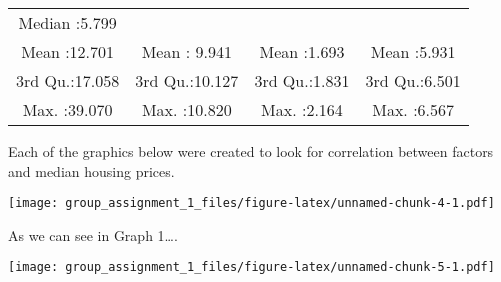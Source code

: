 \documentclass[
]{article}
\begin{document}
\begin{longtable}[]{@{}cccc@{}}
\begin{minipage}[t]{0.20\columnwidth}
Median :5.799\strut
\end{minipage}\tabularnewline
\begin{minipage}[t]{0.26\columnwidth}\centering
Mean :12.701\strut
\end{minipage} & \begin{minipage}[t]{0.21\columnwidth}\centering
Mean : 9.941\strut
\end{minipage} & \begin{minipage}[t]{0.20\columnwidth}\centering
Mean :1.693\strut
\end{minipage} & \begin{minipage}[t]{0.20\columnwidth}\centering
Mean :5.931\strut
\end{minipage}\tabularnewline
\begin{minipage}[t]{0.26\columnwidth}\centering
3rd Qu.:17.058\strut
\end{minipage} & \begin{minipage}[t]{0.21\columnwidth}\centering
3rd Qu.:10.127\strut
\end{minipage} & \begin{minipage}[t]{0.20\columnwidth}\centering
3rd Qu.:1.831\strut
\end{minipage} & \begin{minipage}[t]{0.20\columnwidth}\centering
3rd Qu.:6.501\strut
\end{minipage}\tabularnewline
\begin{minipage}[t]{0.26\columnwidth}\centering
Max. :39.070\strut
\end{minipage} & \begin{minipage}[t]{0.21\columnwidth}\centering
Max. :10.820\strut
\end{minipage} & \begin{minipage}[t]{0.20\columnwidth}\centering
Max. :2.164\strut
\end{minipage} & \begin{minipage}[t]{0.20\columnwidth}\centering
Max. :6.567\strut
\end{minipage}\tabularnewline
\bottomrule
\end{longtable}

Each of the graphics below were created to look for correlation between
factors and median housing prices.

\texttt{[image: group\_assignment\_1\_files/figure-latex/unnamed-chunk-4-1.pdf]}

As we can see in Graph 1\ldots{}.

\texttt{[image: group\_assignment\_1\_files/figure-latex/unnamed-chunk-5-1.pdf]}
\end{document}
